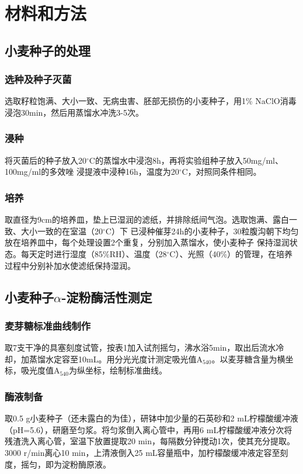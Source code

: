 \documentclass[UTF8]{ctexart}
\begin{document}
    
    
    \section{材料和方法}

    \subsection{小麦种子的处理}
    \subsubsection*{选种及种子灭菌}
    选取籽粒饱满、大小一致、无病虫害、胚部无损伤的小麦种子，用1\% NaClO消毒
    浸泡30min，然后用蒸馏水冲洗3-5次。
    \subsubsection*{浸种}
    将灭菌后的种子放入20$^{\circ}$C的蒸馏水中浸泡8h，再将实验组种子放入50mg/ml、100mg/ml的多效唑
    浸提液中浸种16h，温度为20$^{\circ}$C，对照同条件相同。
    \subsubsection*{培养}
    取直径为9cm的培养皿，垫上已湿润的滤纸，并排除纸间气泡。选取饱满、露白一致、大小一致的在室温（20$^{\circ}$C）下
    已浸种催芽24h的小麦种子，30粒腹沟朝下均匀放在培养皿中，每个处理设置2个重复，分别加入蒸馏水，使小麦种子
    保持湿润状态。每天定时进行湿度（85\%RH）、温度（28$^{\circ}$C）、光照（40\%）的管理，在培养过程中分别补加水使滤纸保持湿润。
    
    \subsection{小麦种子$\alpha$-淀粉酶活性测定}
    \subsubsection*{麦芽糖标准曲线制作}
    取7支干净的具塞刻度试管，按表1加入试剂摇匀，沸水浴5min，取出后流水冷却，加蒸馏水定容至10mL。用分光光度计测定吸光值A$_{540}$。以麦芽糖含量为横坐标，吸光度值A$_{540}$为纵坐标，绘制标准曲线。
    \subsubsection*{酶液制备}
    取0.5 g小麦种子（还未露白的为佳），研钵中加少量的石英砂和2 mL柠檬酸缓冲液（pH=5.6），研磨至匀浆。将匀浆倒入离心管中，再用6 mL柠檬酸缓冲液分次将残渣洗入离心管，室温下放置提取20 min，每隔数分钟搅动1次，使其充分提取。3000 r/min离心10 min，上清液倒入25 mL容量瓶中，加柠檬酸缓冲液定容至刻度，摇匀，即为淀粉酶原液。
\end{document}
